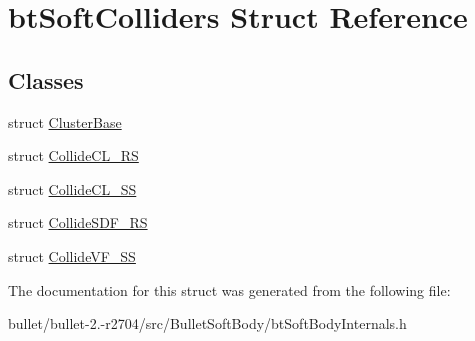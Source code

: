 \hypertarget{structbt_soft_colliders}{\section{bt\+Soft\+Colliders Struct Reference}
\label{structbt_soft_colliders}
}
\subsection*{Classes}
\begin{DoxyCompactItemize}
\item 
struct \hyperlink{structbt_soft_colliders_1_1_cluster_base}{Cluster\+Base}
\item 
struct \hyperlink{structbt_soft_colliders_1_1_collide_c_l___r_s}{Collide\+C\+L\+\_\+\+R\+S}
\item 
struct \hyperlink{structbt_soft_colliders_1_1_collide_c_l___s_s}{Collide\+C\+L\+\_\+\+S\+S}
\item 
struct \hyperlink{structbt_soft_colliders_1_1_collide_s_d_f___r_s}{Collide\+S\+D\+F\+\_\+\+R\+S}
\item 
struct \hyperlink{structbt_soft_colliders_1_1_collide_v_f___s_s}{Collide\+V\+F\+\_\+\+S\+S}
\end{DoxyCompactItemize}


The documentation for this struct was generated from the following file\+:\begin{DoxyCompactItemize}
\item 
bullet/bullet-\/2.-\/r2704/src/\+Bullet\+Soft\+Body/bt\+Soft\+Body\+Internals.\+h\end{DoxyCompactItemize}
